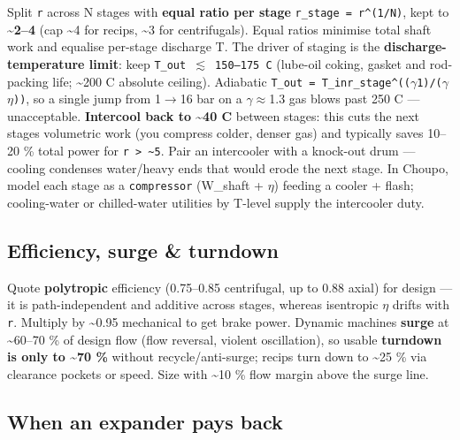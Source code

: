 \documentclass[11pt,a4paper]{article}
\begin{document}
Split \texttt{r} across N stages with \textbf{equal ratio per stage}
\texttt{r\_stage\ =\ r\^{}(1/N)}, kept to \textbf{\textasciitilde2--4}
(cap \textasciitilde4 for recips, \textasciitilde3 for centrifugals).
Equal ratios minimise total shaft work and equalise per-stage discharge
T. The driver of staging is the \textbf{discharge-temperature limit}:
keep \texttt{T\_out\ \(\lesssim\)\ 150--175\ \textdegree{}C} (lube-oil coking, gasket and
rod-packing life; \textasciitilde200 \textdegree{}C absolute ceiling). Adiabatic
\texttt{T\_out\ =\ T\_in\textperiodcentered{}r\_stage\^{}((\(\gamma\)\textminus{}1)/(\(\gamma\)\(\eta\)))}, so a single jump
from 1\(\rightarrow\)16 bar on a \(\gamma\)\(\approx\)1.3 gas blows past 250 \textdegree{}C --- unacceptable.
\textbf{Intercool back to \textasciitilde40 \textdegree{}C} between stages: this
cuts the next stage\textquotesingle s volumetric work (you compress
colder, denser gas) and typically saves 10--20 \% total power for
\texttt{r\ \textgreater{}\ \textasciitilde{}5}. Pair an intercooler with
a knock-out drum --- cooling condenses water/heavy ends that would erode
the next stage. In Choupo, model each stage as a \texttt{compressor}
(W\_shaft + \(\eta\)) feeding a cooler + flash; cooling-water or chilled-water
utilities by T-level supply the intercooler duty.

\hypertarget{efficiency-surge--turndown}{%
\subsection{Efficiency, surge \&
turndown}\label{efficiency-surge--turndown}}

Quote \textbf{polytropic} efficiency (0.75--0.85 centrifugal, up to 0.88
axial) for design --- it is path-independent and additive across stages,
whereas isentropic \(\eta\) drifts with \texttt{r}. Multiply by
\textasciitilde0.95 mechanical to get brake power. Dynamic machines
\textbf{surge} at \textasciitilde60--70 \% of design flow (flow
reversal, violent oscillation), so usable \textbf{turndown is only to
\textasciitilde70 \%} without recycle/anti-surge; recips turn down to
\textasciitilde25 \% via clearance pockets or speed. Size with
\textasciitilde10 \% flow margin above the surge line.

\hypertarget{when-an-expander-pays-back}{%
\subsection{When an expander pays
back}\label{when-an-expander-pays-back}}
\end{document}
